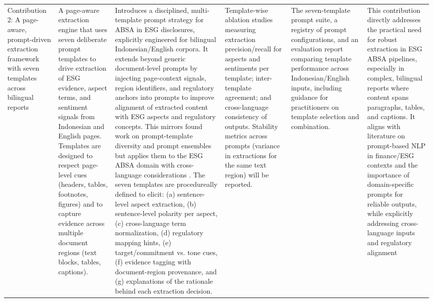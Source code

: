 \begin{landscape}
\begin{longtable}{p{2cm} p{3cm} p{6cm} p{3cm} p{3cm} p{6cm}}
\addlinespace
Contribution 2: A page-aware, prompt-driven extraction framework with seven templates across bilingual reports & A page-aware extraction engine that uses seven deliberate prompt templates to drive extraction of ESG evidence, aspect terms, and sentiment signals from Indonesian and English pages. Templates are designed to respect page-level cues (headers, tables, footnotes, figures) and to capture evidence across multiple document regions (text blocks, tables, captions). & Introduces a disciplined, multi-template prompt strategy for ABSA in ESG disclosures, explicitly engineered for bilingual Indonesian/English corpora. It extends beyond generic document-level prompts by injecting page-context signals, region identifiers, and regulatory anchors into prompts to improve alignment of extracted content with ESG aspects and regulatory concepts. This mirrors found work on prompt-template diversity and prompt ensembles but applies them to the ESG ABSA domain with cross-language considerations \cite{10.1609/aaai.v38i21.30574,10.48550/arxiv.2510.01222,10.18653/v1/2023.emnlp-main.975,10.1108/dta-01-2024-0065} . The seven templates are procedureally defined to elicit: (a) sentence-level aspect extraction, (b) sentence-level polarity per aspect, (c) cross-language term normalization, (d) regulatory mapping hints, (e) target/commitment vs. tone cues, (f) evidence tagging with document-region provenance, and (g) explanations of the rationale behind each extraction decision. & Template-wise ablation studies measuring extraction precision/recall for aspects and sentiments per template; inter-template agreement; and cross-language consistency of outputs. Stability metrics across prompts (variance in extractions for the same text region) will be reported. & The seven-template prompt suite, a registry of prompt configurations, and an evaluation report comparing template performance across Indonesian/English inputs, including guidance for practitioners on template selection and combination. & This contribution directly addresses the practical need for robust extraction in ESG ABSA pipelines, especially in complex, bilingual reports where content spans paragraphs, tables, and captions. It aligns with literature on prompt-based NLP in finance/ESG contexts and the importance of domain-specific prompts for reliable outputs, while explicitly addressing cross-language inputs and regulatory alignment \cite{10.21203/rs.3.rs-6614220/v1,10.48550/arxiv.2510.01222,10.18653/v1/2023.emnlp-main.975,10.1108/dta-01-2024-0065,10.1609/aaai.v38i21.30574} \\

\end{longtable}
\end{landscape}
